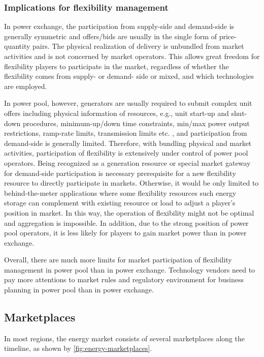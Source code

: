 \subsubsection{Implications for flexibility management}
In power exchange, the participation from supply-side and demand-side is generally symmetric and offers/bids are usually in the single form of price-quantity pairs. The physical realization of delivery is unbundled  from market activities and is not concerned by market operators. This allows great freedom for flexibility players to participate in the market, regardless of whether the flexibility comes from supply- or demand- side or mixed, and which technologies are employed. 

In power pool, however, generators are usually required to submit complex unit offers including physical information of resources, e.g., unit start-up and shut-down procedures, minimum-up/down time constraints, min/max power output restrictions, ramp-rate limits, transmission limits etc. \cite{Kardakos2013}, and participation from demand-side is generally limited. Therefore, with bundling physical and market activities, participation of flexibility is extensively under control of power pool operators. Being recognized as a generation resource or special market gateway for demand-side participation is necessary prerequisite for a new flexibility resource to directly participate in markets. Otherwise, it would be only limited to behind-the-meter applications where some flexibility resources such energy storage can complement with existing resource or load to adjust a player's position in market. In this way, the operation of flexibility might not be optimal and aggregation is impossible. In addition, due to the strong position of power pool operators, it is less likely for players to gain market power than in power exchange.

Overall, there are much more limits for market participation of flexibility management in power pool than in power exchange. Technology vendors need to pay more attentions to market rules and regulatory environment for business planning in power pool than in power exchange. 

\subsection{Marketplaces}

In most regions, the energy market consists of several marketplaces along the timeline, as shown by \ref{fig:energy-marketplaces}.


